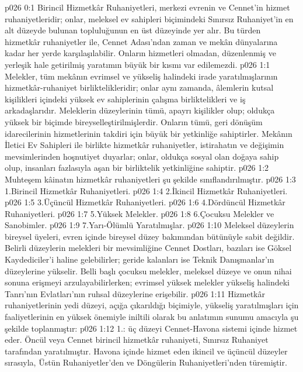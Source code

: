\vs p026 0:1 Birincil Hizmetkâr Ruhaniyetleri, merkezi evrenin ve Cennet’in hizmet ruhaniyetleridir; onlar, meleksel ev sahipleri biçimindeki Sınırsız Ruhaniyet’in en alt düzeyde bulunan topluluğunun en üst düzeyinde yer alır. Bu türden hizmetkâr ruhaniyetler ile, Cennet Adası’ndan zaman ve mekân dünyalarına kadar her yerde karşılaşılabilir. Onların hizmetleri olmadan, düzenlenmiş ve yerleşik hale getirilmiş yaratımın büyük bir kısmı var edilemezdi.
\vs p026 1:1 Melekler, tüm mekânın evrimsel ve yükseliş halindeki irade yaratılmışlarının hizmetkâr\hyp{}ruhaniyet birliktelikleridir; onlar aynı zamanda, âlemlerin kutsal kişilikleri içindeki yüksek ev sahiplerinin çalışma birliktelikleri ve iş arkadaşlarıdır. Meleklerin düzeylerinin tümü, apayrı kişilikler olup; oldukça yüksek bir biçimde bireyselleştirilmişlerdir. Onların tümü, geri dönüşüm idarecilerinin hizmetlerinin takdiri için büyük bir yetkinliğe sahiptirler. Mekânın İletici Ev Sahipleri ile birlikte hizmetkâr ruhaniyetler, istirahatın ve değişimin mevsimlerinden hoşnutiyet duyarlar; onlar, oldukça sosyal olan doğaya sahip olup, insanları fazlasıyla aşan bir birliktelik yetkinliğine sahiptir.
\vs p026 1:2 Muhteşem kâinatın hizmetkâr ruhaniyetleri şu şekilde sınıflandırılmıştır.
\vs p026 1:3 1.\bibnobreakspace Birincil Hizmetkâr Ruhaniyetleri.
\vs p026 1:4 2.\bibnobreakspace İkincil Hizmetkâr Ruhaniyetleri.
\vs p026 1:5 3.\bibnobreakspace Üçüncül Hizmetkâr Ruhaniyetleri.
\vs p026 1:6 4.\bibnobreakspace Dördüncül Hizmetkâr Ruhaniyetleri.
\vs p026 1:7 5.\bibnobreakspace Yüksek Melekler.
\vs p026 1:8 6.\bibnobreakspace Çocuksu Melekler ve Sanobimler.
\vs p026 1:9 7.\bibnobreakspace Yarı\hyp{}Ölümlü Yaratılmışlar.
\vs p026 1:10 Meleksel düzeylerin bireysel üyeleri, evren içinde bireysel düzey bakımından bütünüyle sabit değildir. Belirli düzeylerin melekleri bir mevsimliğine Cennet Dostları, bazıları ise Göksel Kaydediciler’i haline gelebilirler; geride kalanları ise Teknik Danışmanlar’ın düzeylerine yükselir. Belli başlı çocuksu melekler, meleksel düzeye ve onun nihai sonuna erişmeyi arzulayabilirlerken; evrimsel yüksek melekler yükseliş halindeki Tanrı’nın Evlatları’nın ruhsal düzeylerine erişebilir.
\vs p026 1:11 Hizmetkâr ruhaniyetlerinin yedi düzeyi, açığa çıkarıldığı biçimiyle, yükseliş yaratılmışları için faaliyetlerinin en yüksek önemiyle iniltili olarak bu anlatımın sunumu amacıyla şu şekilde toplanmıştır:
\vs p026 1:12 1.\bibnobreakspace {}:  üç düzeyi Cennet\hyp{}Havona sistemi içinde hizmet eder. Öncül veya Cennet birincil hizmetkâr ruhaniyeti, Sınırsız Ruhaniyet tarafından yaratılmıştır. Havona içinde hizmet eden ikincil ve üçüncül düzeyler sırasıyla, Üstün Ruhaniyetler’den ve Döngülerin Ruhaniyetleri’nden türemiştir.
